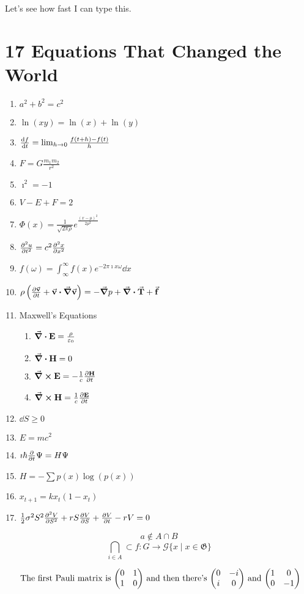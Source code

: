 \documentclass[a4paper,twoside,master.tex]{subfiles}
\begin{document}

Let's see how fast I can type this.

\section{17 Equations That Changed the World}\label{sec:17_equations_that_changed_the_world}
\begin{enumerate}
    \item $ a^2 + b^2 = c^2 $ 
    \item $ \ln(xy) = \ln(x) + \ln(y) $ 
    \item $\dv{f}{t} = \lim_{h \to 0} \frac{f(t +  h)-f(t)}{h} $
    \item $ F = G \frac{m_1m_2}{r^2} $
    \item $ \imath^2 =-1 $
    \item $ V-E + F = 2 $
    \item $ \Phi(x) = \frac{1}{\sqrt{2 \pi \rho}} e^{\frac{(x- \mu)^2}{2 \mu^2 }} $
    \item $\pdv[2]{u}{t} = c^2\pdv[2]{x}{x} $
    \item $ f(\omega) =\int_{\infty}^{\infty} f(x) e^{-2 \pi \imath x \omega}\dd{x}  $
    \item $ \rho \left(\pdv{\va{v}}{t} + \va{v} \vdot\grad{\va{v}}\right) =-\grad{p} +\div{\va{T}} + \va{f} $ 
    \item Maxwell's Equations
        \begin{enumerate}
            \item $\div{\vb{E}}= \frac{\rho}{\varepsilon_0} $
            \item $\div{\vb{H}} = 0 $
            \item $\curl{\vb{E}} =- \frac{1}{c}\pdv{\vb{H}}{t} $
            \item $\curl{\vb{H}} = \frac{1}{c}\pdv{\vb{E}}{t} $
        \end{enumerate}
    \item $\dd{S}\geq 0 $
    \item $ E = mc^2 $
    \item $ \imath \hbar\pdv{t} \Psi = H \Psi $
    \item $ H = -\sum p(x) \log(p(x)) $
    \item $ x_{t+1} = kx_{t}(1-x_{t}) $ 
    \item $ \frac{1}{2} \sigma^2 S^2\pdv[2]{V}{S} + rS\pdv{V}{S} +\pdv{V}{t} - rV = 0 $
\end{enumerate}
\begin{equation}
    a\notin A \cap B 
\end{equation}
\begin{equation}
    \bigcap_{i\in A} \subset f \colon G\to \mathcal{G} \{x \mid x\in \mathfrak{G}\} 
\end{equation}

\begin{equation}
    \text{ The first Pauli matrix is } \mqty(\pmat{1}) \text{ and then there's } \mqty(\pmat{2}) \text{ and } \mqty(\pmat{3})
\end{equation}
\end{document}
